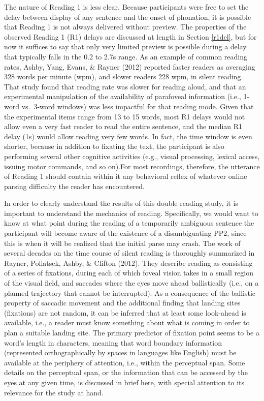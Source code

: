 \documentclass[11pt,oneside]{book}
\begin{document}
The nature of Reading 1 is less clear. Because participants were free to set the delay between display of any sentence and the onset of phonation, it is possible that Reading 1 is not always delivered without preview. The properties of the observed Reading 1 (R1) delays are discussed at length in Section \ref{r1del}, but for now it suffices to say that only very limited preview is possible during a delay that typically falls in the 0.2 to 2.7s range. As an example of common reading rates, Ashby, Yang, Evans, \& Rayner (2012) reported faster readers as averaging 328 words per minute (wpm), and slower readers 228 wpm, in silent reading. That study found that reading rate was slower for reading aloud, and that an experimental manipulation of the availability of parafoveal information (i.e., 1-word vs.~3-word windows) was less impactful for that reading mode. Given that the experimental items range from 13 to 15 words, most R1 delays would not allow even a very fast reader to read the entire sentence, and the median R1 delay (1s) would allow reading very few words. In fact, the time window is even shorter, because in addition to fixating the text, the participant is also performing several other cognitive activities (e.g., visual processing, lexical access, issuing motor commands, and so on).For most recordings, therefore, the utterance of Reading 1 should contain within it any behavioral reflex of whatever online parsing difficulty the reader has encountered.

In order to clearly understand the results of this double reading study, it is important to understand the mechanics of reading. Specifically, we would want to know at what point during the reading of a temporarily ambiguous sentence the participant will become aware of the existence of a disambiguating PP2, since this is when it will be realized that the initial parse may crash. The work of several decades on the time course of silent reading is thoroughly summarized in Rayner, Pollatsek, Ashby, \& Clifton (2012). They describe reading as consisting of a series of fixations, during each of which foveal vision takes in a small region of the visual field, and saccades where the eyes move ahead ballistically (i.e., on a planned trajectory that cannot be interrupted). As a consequence of the ballistic property of saccadic movement and the additional finding that landing sites (fixations) are not random, it can be inferred that at least some look-ahead is available, i.e., a reader must know something about what is coming in order to plan a suitable landing site. The primary predictor of fixation point seems to be a word's length in characters, meaning that word boundary information (represented orthographically by spaces in languages like English) must be available at the periphery of attention, i.e., within the perceptual span. Some details on the perceptual span, or the information that can be accessed by the eyes at any given time, is discussed in brief here, with special attention to its relevance for the study at hand.
\end{document}

